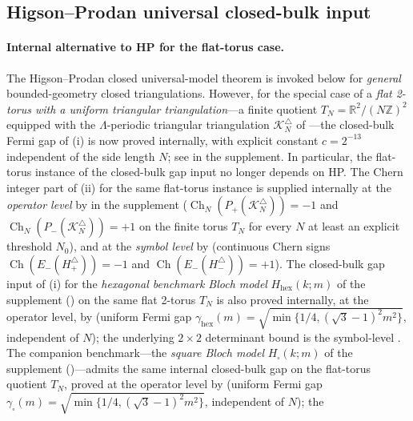 \documentclass[11pt]{article}
\numberwithin{equation}{section}
\theoremstyle{definition}
\theoremstyle{remark}
\newcommand{\K}{\mathcal{K}}
\newcommand{\Ch}{\operatorname{Ch}}
\newcommand{\hexagon}{\mathrm{hex}}
\begin{document}
\subsection{Higson--Prodan universal closed-bulk input}

\paragraph{Internal alternative to HP for the flat-torus case.}\label{par:internal_torus_alternative}
The Higson--Prodan closed universal-model theorem  is invoked below for
\emph{general} bounded-geometry closed triangulations. However, for the special case of a
\emph{flat 2-torus with a uniform triangular triangulation}---a finite quotient
\(T_N=\mathbb R^2/(N\mathbb Z)^2\) equipped with the \(\Lambda\)-periodic triangular
triangulation \(\K_N^\triangle\) of ---the closed-bulk Fermi gap of
(i) is now proved internally, with explicit constant
\(c=2^{-13}\) independent of the side length \(N\); see
 in the supplement. In particular, the flat-torus instance of the
closed-bulk gap input no longer depends on HP. The Chern integer part of
(ii) for the same flat-torus instance is supplied internally at the
\emph{operator level} by  in the supplement
(\(\Ch_N(P_+(\K_N^\triangle))=-1\) and \(\Ch_N(P_-(\K_N^\triangle))=+1\) on the finite torus
\(T_N\) for every \(N\) at least an explicit threshold \(N_0\)), and at the
\emph{symbol level} by  (continuous Chern signs
\(\Ch(E_-(H_+^\triangle))=-1\) and \(\Ch(E_-(H_-^\triangle))=+1\)). The closed-bulk gap input
of (i) for the \emph{hexagonal benchmark Bloch model}
\(H_{\hexagon}(k;m)\) of the supplement () on the same flat
2-torus \(T_N\) is also proved internally, at the operator level, by
 (uniform Fermi gap
\(\gamma_{\hexagon}(m)=\sqrt{\min\{1/4,(\sqrt{3}-1)^2m^2\}}\), independent of \(N\)); the
underlying \(2\times 2\) determinant bound is the symbol-level
. The companion benchmark---the \emph{square Bloch model}
\(H_{\square}(k;m)\) of the supplement ()---admits the same
internal closed-bulk gap on the flat-torus quotient \(T_N\), proved at the operator level by
 (uniform Fermi gap
\(\gamma_{\square}(m)=\sqrt{\min\{1/4,(\sqrt{3}-1)^2m^2\}}\), independent of \(N\)); the
\end{document}
